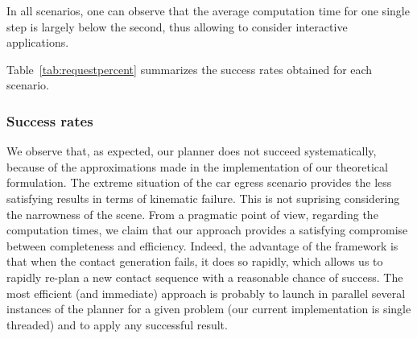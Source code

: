 In all scenarios, one can observe that the average computation time for one single step is largely below the second,
thus allowing to consider \gls{interactive} applications. 

Table~\ref{tab:requestpercent} summarizes the success rates obtained for each scenario.

\subsubsection{Success rates}
We observe that, as expected, our planner does not succeed systematically, because of the approximations made in the implementation
of our theoretical formulation. The extreme situation of the car egress scenario provides the less satisfying results in terms of kinematic failure. This is not
suprising considering the narrowness of the scene.
From a pragmatic point of view, regarding the computation times, we claim that our approach provides a satisfying compromise between completeness and efficiency.
Indeed, the advantage of the framework is that when the contact generation fails, it does so rapidly, which allows us to rapidly re-plan a new contact sequence with a reasonable chance of success.
The most efficient (and immediate) approach is probably to launch in parallel several instances of the planner for a given problem (our current implementation is single threaded) and to apply any successful result.
